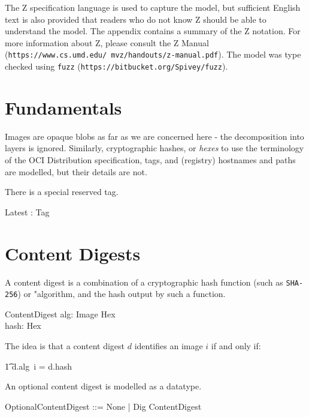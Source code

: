 \documentclass[a4paper,twoside,12pt]{article}
\begin{document}
The Z specification language is used to capture the model, but sufficient English text is also provided that readers who do not know Z should be able to understand the model. The appendix contains a summary of the Z notation.
For more information about Z, please consult the Z Manual (\texttt{https://www.cs.umd.edu/~mvz/handouts/z-manual.pdf}).
The model was type checked using \texttt{fuzz} (\texttt{https://bitbucket.org/Spivey/fuzz}).

\section{Fundamentals}

Images are opaque blobs as far as we are concerned here - the decomposition into layers is ignored.
Similarly, cryptographic hashes, or \textit{hexes} to use the terminology of the OCI Distribution specification, tags, and (registry) hostnames and paths are modelled, but their details are not.
\begin{zed}
\end{zed}

There is a special reserved tag.
\begin{axdef}
    Latest : Tag
\end{axdef}

\newpage
\section{Content Digests}

A content digest is a combination of a cryptographic hash function (such as \texttt{SHA-256}) or "algorithm, and the hash output by such a function. 
\begin{schema}{ContentDigest}
    alg: Image \fun Hex \\
    hash: Hex \\ 
\end{schema}

The idea is that a content digest $d$ identifies an image $i$ if and only if:\\
\begin{zed}
\t1 d.alg~i = d.hash
\end{zed}

An optional content digest is modelled as a datatype.
\begin{zed}
    OptionalContentDigest ::= None | Dig \ldata ContentDigest \rdata
\end{zed}
\end{document}
